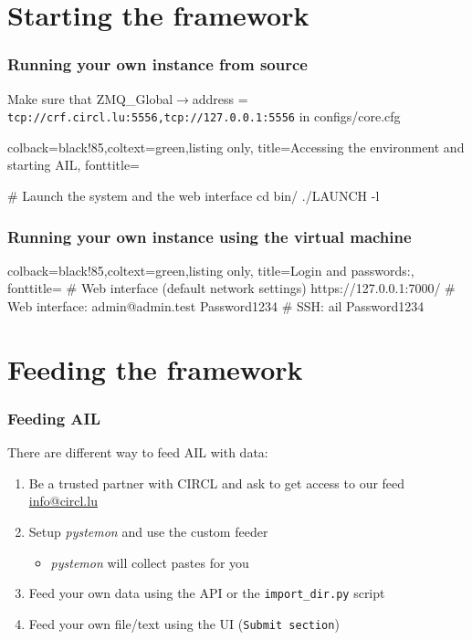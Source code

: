 \documentclass{beamer}
\begin{document}
\section{Starting the framework}
\lstset{style=bash}
\begin{frame}[fragile]
    \frametitle{Running your own instance from source}
    {\scriptsize Make sure that ZMQ\_Global$\rightarrow$address = \texttt{tcp://crf.circl.lu:5556,tcp://127.0.0.1:5556} in configs/core.cfg}
    \begin{tcblisting}{colback=black!85,coltext=green,listing only,
        title=Accessing the environment and starting AIL, fonttitle=\bfseries}

# Launch the system and the web interface
cd bin/
./LAUNCH -l

\end{tcblisting}
\end{frame}

\begin{frame}[fragile]
    \frametitle{Running your own instance using the virtual machine}
    \begin{tcblisting}{colback=black!85,coltext=green,listing only,
        title=Login and passwords:, fonttitle=\bfseries}
# Web interface (default network settings)
    https://127.0.0.1:7000/
# Web interface:
    admin@admin.test
    Password1234
# SSH:
    ail
    Password1234
\end{tcblisting}

\end{frame}

\section{Feeding the framework}
\begin{frame}
\frametitle{Feeding AIL}
    There are different way to feed AIL with data:
    \begin{enumerate}
        \item Be a trusted partner with CIRCL and ask to get access to our feed {\tiny \href{mailto:info@circl.lu}{info@circl.lu}}
        \item Setup \textit{pystemon} and use the custom feeder
            \begin{itemize}
                \item \textit{pystemon} will collect pastes for you
            \end{itemize}
        \item Feed your own data using the API or the \texttt{import\_dir.py} script
        \item Feed your own file/text using the UI (\texttt{Submit section})
    \end{enumerate}
\end{frame}
\end{document}
